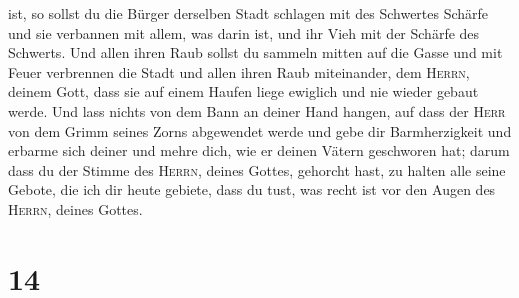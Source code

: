 ist,  so sollst du die Bürger derselben Stadt schlagen
mit des Schwertes Schärfe und sie verbannen mit allem, was darin ist,
und ihr Vieh mit der Schärfe des Schwerts.  Und allen
ihren Raub sollst du sammeln mitten auf die Gasse und mit Feuer
verbrennen die Stadt und allen ihren Raub miteinander, dem
\textsc{Herrn}, deinem Gott, dass sie auf einem Haufen liege ewiglich
und nie wieder gebaut werde.  Und lass nichts von dem
Bann an deiner Hand hangen, auf dass der \textsc{Herr} von dem Grimm
seines Zorns abgewendet werde und gebe dir Barmherzigkeit und erbarme
sich deiner und mehre dich, wie er deinen Vätern geschworen hat;
 darum dass du der Stimme des \textsc{Herrn}, deines
Gottes, gehorcht hast, zu halten alle seine Gebote, die ich dir heute
gebiete, dass du tust, was recht ist vor den Augen des \textsc{Herrn},
deines Gottes.

\hypertarget{section-13}{%
\section{14}\label{section-13}}

